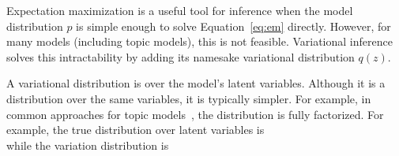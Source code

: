 Expectation maximization is a useful tool for inference when the model
distribution $p$ is simple enough to solve Equation~\ref{eq:em}
directly.  However, for many models (including topic models), this is
not feasible.  Variational inference solves this intractability by
adding its namesake variational distribution $q(z)$.

A variational distribution is over the model's latent variables.
Although it is a distribution over the same variables, it is typically
simpler.  For example, in common approaches for topic models~\citep{}, the
distribution is fully factorized.  For example, the true distribution
over latent variables is
\begin{equation}

\end{equation}
while the variation distribution is
\begin{equation}

\end{equation}

